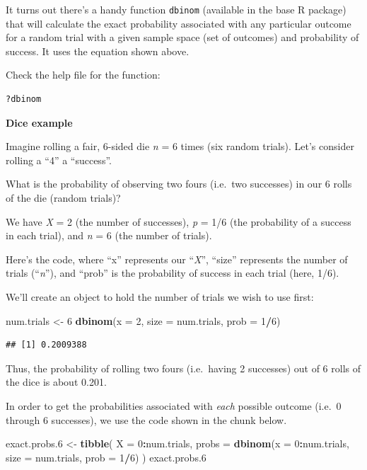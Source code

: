 \documentclass[
]{book}
\newenvironment{Shaded}{\begin{snugshade}}{\end{snugshade}}
\newcommand{\AttributeTok}[1]{\textcolor[rgb]{0.13,0.29,0.53}{#1}}
\newcommand{\DecValTok}[1]{\textcolor[rgb]{0.00,0.00,0.81}{#1}}
\newcommand{\FloatTok}[1]{\textcolor[rgb]{0.00,0.00,0.81}{#1}}
\newcommand{\FunctionTok}[1]{\textcolor[rgb]{0.13,0.29,0.53}{\textbf{#1}}}
\newcommand{\NormalTok}[1]{#1}
\newcommand{\OtherTok}[1]{\textcolor[rgb]{0.56,0.35,0.01}{#1}}
\newcommand{\SpecialCharTok}[1]{\textcolor[rgb]{0.81,0.36,0.00}{\textbf{#1}}}
\begin{document}
It turns out there's a handy function \texttt{dbinom} (available in the base R package) that will calculate the exact probability associated with any particular outcome for a random trial with a given sample space (set of outcomes) and probability of success. It uses the equation shown above.

Check the help file for the function:

\begin{verbatim}
?dbinom
\end{verbatim}

\textbf{Dice example}

Imagine rolling a fair, 6-sided die \emph{n} = 6 times (six random trials). Let's consider rolling a ``4'' a ``success''.

What is the probability of observing two fours (i.e.~two successes) in our 6 rolls of the die (random trials)?

We have \emph{X} = 2 (the number of successes), \emph{p} = 1/6 (the probability of a success in each trial), and \emph{n} = 6 (the number of trials).

Here's the code, where ``x'' represents our ``\emph{X}'', ``size'' represents the number of trials (``\emph{n}''), and ``prob'' is the probability of success in each trial (here, 1/6).

We'll create an object to hold the number of trials we wish to use first:

\begin{Shaded}
\begin{Highlighting}[]
\NormalTok{num.trials }\OtherTok{\textless{}{-}} \DecValTok{6}
\FunctionTok{dbinom}\NormalTok{(}\AttributeTok{x =} \DecValTok{2}\NormalTok{, }\AttributeTok{size =}\NormalTok{ num.trials, }\AttributeTok{prob =} \DecValTok{1}\SpecialCharTok{/}\DecValTok{6}\NormalTok{)}
\end{Highlighting}
\end{Shaded}

\begin{verbatim}
## [1] 0.2009388
\end{verbatim}

Thus, the probability of rolling two fours (i.e.~having 2 successes) out of 6 rolls of the dice is about 0.201.

In order to get the probabilities associated with \emph{each} possible outcome (i.e.~0 through 6 successes), we use the code shown in the chunk below.

\begin{Shaded}
\begin{Highlighting}[]
\NormalTok{exact.probs}\FloatTok{.6} \OtherTok{\textless{}{-}} \FunctionTok{tibble}\NormalTok{(}
  \AttributeTok{X =} \DecValTok{0}\SpecialCharTok{:}\NormalTok{num.trials,}
  \AttributeTok{probs =} \FunctionTok{dbinom}\NormalTok{(}\AttributeTok{x =} \DecValTok{0}\SpecialCharTok{:}\NormalTok{num.trials, }\AttributeTok{size =}\NormalTok{ num.trials, }\AttributeTok{prob =} \DecValTok{1}\SpecialCharTok{/}\DecValTok{6}\NormalTok{)}
\NormalTok{  )}
\NormalTok{exact.probs}\FloatTok{.6}
\end{Highlighting}
\end{Shaded}
\end{document}
